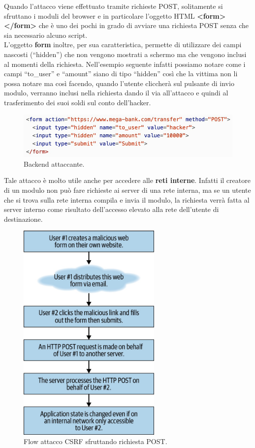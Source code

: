Quando l'attacco viene effettuato tramite richieste
POST, solitamente si sfruttano i moduli del browser e in particolare l'oggetto HTML \textbf{<form></form>} che è uno dei pochi in grado di avviare una richiesta POST senza
che sia necessario alcuno script.\\

L'oggetto \textbf{form} inoltre, per sua caratteristica, permette di utilizzare dei campi nascosti (``hidden'') che non vengono mostrati a schermo ma che vengono inclusi al momenti della richiesta. Nell'esempio seguente infatti possiamo notare come i campi ``to\_user'' e ``amount'' siano di tipo ``hidden'' così che la vittima non li possa notare ma così facendo, quando l'utente cliccherà sul pulsante di invio modulo, verranno inclusi nella richiesta dando il via all'attacco e quindi al trasferimento dei suoi soldi sul conto dell'hacker.

\begin{figure}[H]
	\centering
	\includegraphics[width=12cm, keepaspectratio]{capitoli/web_security/imgs/csrf_banca_3.png}
	\caption{Backend attaccante.}
	\label{fig:csrf_banca_3}
\end{figure}

Tale attacco è molto utile anche per accedere alle \textbf{reti interne}. Infatti il creatore di un modulo non può fare richieste ai server di una rete interna, ma se un utente che si trova sulla rete interna compila e invia il modulo, la richiesta verrà fatta al server interno come risultato dell'accesso elevato alla rete dell'utente di destinazione. 

\begin{figure}[H]
	\centering
	\includegraphics[width=7cm, keepaspectratio]{capitoli/web_security/imgs/post_flow.png}
	\caption{Flow attacco CSRF sfruttando richiesta POST.}
\end{figure}
